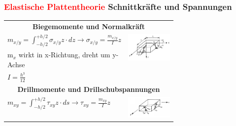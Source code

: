 	\begin{minipage}{0.65\linewidth}
		
		\subsubsection{\textcolor{red}{Elastische Plattentheorie} Schnittkräfte und Spannungen}
		
			\begin{tabular}{|lp{0.4\linewidth}|}
					
					\multicolumn{2}{c}{\textbf{Biegemomente und Normalkräft}} \\
					
					$ m_{x/y} = \int_{-h/2}^{+h/2} \sigma_{x/y} z \cdot dz \rightarrow \sigma_{x/y} = \frac{m_{x/y}}{I}z $	& \multirow{2}{*}{\includegraphics[width=\linewidth]{images/DW1Momente.PNG}}	\\
											 m$_x$ wirkt in x-Richtung, dreht um y-Achse  & \\
											 $ I = \frac{h^3}{12} $	 &  \\ \hline
					
					\multicolumn{2}{c}{\textbf{Drillmomente und Drillschubspannungen}} \\
					
					$ m_{xy} = \int_{-h/2}^{+h/2} \tau_{xy} z \cdot ds \rightarrow \tau_{xy} = \frac{m_{xy}}{I} z $		&	\multirow{2}{*}{\includegraphics[width=\linewidth]{images/DW2Drillmomente.PNG}} \\
					

\end{tabular}
\end{minipage}
